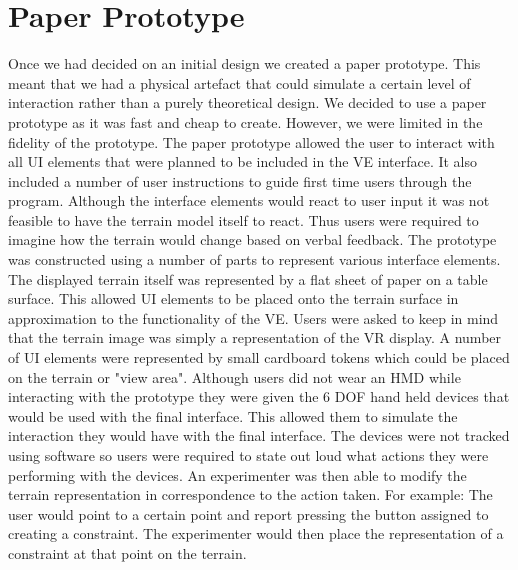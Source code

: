 \documentclass{sig-alternate-05-2015}
\begin{document}
\section{Paper Prototype}
Once we had decided on an initial design we created a paper prototype. This meant that we had a physical artefact that could simulate a certain level of interaction rather than a purely theoretical design. We decided to use a paper prototype as it was fast and cheap to create. However, we were limited in the fidelity of the prototype.
\newline\newline
The paper prototype allowed the user to interact with all UI elements that were planned to be included in the VE interface. It also included a number of user instructions to guide first time users through the program. Although the interface elements would react to user input it was not feasible to have the terrain model itself to react. Thus users were required to imagine how the terrain would change based on verbal feedback.
\newline\newline
The prototype was constructed using a number of parts to represent various interface elements. The displayed terrain itself was represented by a flat sheet of paper on a table surface. This allowed UI elements to be placed onto the terrain surface in approximation to the functionality of the VE. Users were asked to keep in mind that the terrain image was simply a representation of the VR display. A number of UI elements were represented by small cardboard tokens which could be placed on the terrain or "view area".
\newline\newline
Although users did not wear an HMD while interacting with the prototype they were given the 6 DOF hand held devices that would be used with the final interface. This allowed them to simulate the interaction they would have with the final interface. The devices were not tracked using software so users were required to state out loud what actions they were performing with the devices. An experimenter was then able to modify the terrain representation in correspondence to the action taken. For example: The user would point to a certain point and report pressing the button assigned to creating a constraint. The experimenter would then place the representation of a constraint at that point on the terrain.
\end{document}
